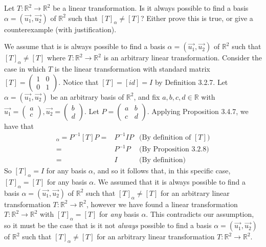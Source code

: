 \documentclass[12pt]{article}
\newenvironment{problem}[2][Problem]
{
	\begin{trivlist} 
		\item[\hskip \labelsep {\bfseries #1 #2:}]
	}
{
	\end{trivlist}
	}
\newenvironment{solution}[1][Solution]
{
	\begin{trivlist} 
		\item[\hskip \labelsep {\itshape #1:}]
	}
	{
	\end{trivlist}
}
\begin{document}
\begin{problem}{1}
Let $T:\mathbb{R}^2 \to \mathbb{R}^2$ be a linear transformation. Is it always possible to find a basis $\alpha=(\vec{u_{1}},\vec{u_{2}})$ of $\mathbb{R}^2$ such that $[T]_{\alpha} \neq [T]$? Either prove this is true, or give a counterexample (with justification).
\noindent
\newline
\newline
\begin{solution}
We assume that is is always possible to find a basis $\alpha=(\vec{u_{1}},\vec{u_{2}})$ of $\mathbb{R}^2$ such that $[T]_{\alpha} \neq [T]$ where $T:\mathbb{R}^2 \to \mathbb{R}^2$ is an arbitrary linear transformation. Consider the case in which $T$ is the linear transformation with standard matrix $[T]=\begin{pmatrix} 1 &0 \\ 0&1 \end{pmatrix}$. Notice that $[T]=[id]=I$ by Definition 3.2.7. Let $\alpha = (\vec{u_{1}},\vec{u_{2}})$ be an arbitrary basis of $\mathbb{R}^2$, and fix $a,b,c,d \in \mathbb{R}$ with $\vec{u_{1}} = \begin{pmatrix} a\\c\end{pmatrix}, \vec{u_{2}} = \begin{pmatrix} b\\d \end{pmatrix}$. Let $P=\begin{pmatrix} a & b\\ c& d \end{pmatrix}$. Applying Proposition 3.4.7, we have that 
\begin{align*}
[T]_{\alpha} = P^{-1} [T] P =& P^{-1} I P & \text{(By definition of $[T]$)}\\
=& P^{-1} P & \text{(By Proposition 3.2.8)}\\
=& I & \text{(By definition)}
\end{align*}
So $[T]_{\alpha} = I$ for any basis $\alpha$, and so it follows that, in this specific case, $[T]_{\alpha} = [T]$ for any basis $\alpha$. We assumed that it is always possible to find a basis $\alpha=(\vec{u_{1}},\vec{u_{2}})$ of $\mathbb{R}^2$ such that $[T]_{\alpha} \neq [T]$ for an arbitrary linear transformation $T:\mathbb{R}^2 \to \mathbb{R}^2$, however we have found a linear transformation $T: \mathbb{R}^2 \to \mathbb{R}^2$ with  $[T]_{\alpha} = [T]$ for {\it any} basis $\alpha$. This contradicts our assumption, so it must be the case that is it not {\it always} possible to find a basis $\alpha=(\vec{u_{1}},\vec{u_{2}})$ of $\mathbb{R}^2$ such that $[T]_{\alpha} \neq [T]$ for an arbitrary linear transformation $T:\mathbb{R}^2 \to \mathbb{R}^2$.
\end{solution}
\end{problem}
\end{document}
